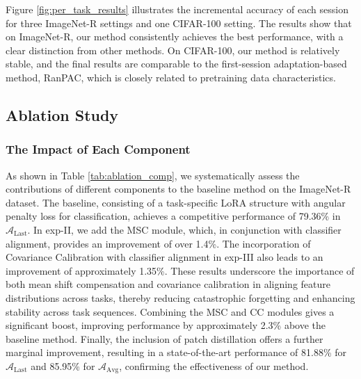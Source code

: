 Figure \ref{fig:per_task_results} illustrates the incremental accuracy of each session for three ImageNet-R settings and one CIFAR-100 setting. The results show that on ImageNet-R, our method consistently achieves the best performance, with a clear distinction from other methods. On CIFAR-100, our method is relatively stable, and the final results are comparable to the first-session adaptation-based method, RanPAC, which is closely related to pretraining data characteristics.
% 
% 
\subsection{Ablation Study}
\subsubsection{The Impact of Each Component}
As shown in Table \ref{tab:ablation_comp}, we systematically assess the contributions of different components to the baseline method on the ImageNet-R dataset. The baseline, consisting of a task-specific LoRA structure with angular penalty loss for classification, achieves a competitive performance of 79.36\% in \( \mathcal{A}_{\text{Last}} \). In exp-II, we add the MSC module, which, in conjunction with classifier alignment, provides an improvement of over 1.4\%. The incorporation of Covariance Calibration with classifier alignment in exp-III also leads to an improvement of approximately 1.35\%. These results underscore the importance of both mean shift compensation and covariance calibration in aligning feature distributions across tasks, thereby reducing catastrophic forgetting and enhancing stability across task sequences. Combining the MSC and CC modules gives a significant boost, improving performance by approximately 2.3\% above the baseline method. Finally, the inclusion of patch distillation offers a further marginal improvement, resulting in a state-of-the-art performance of 81.88\% for \( \mathcal{A}_{\text{Last}} \) and 85.95\% for \( \mathcal{A}_{\text{Avg}} \), confirming the effectiveness of our method.


